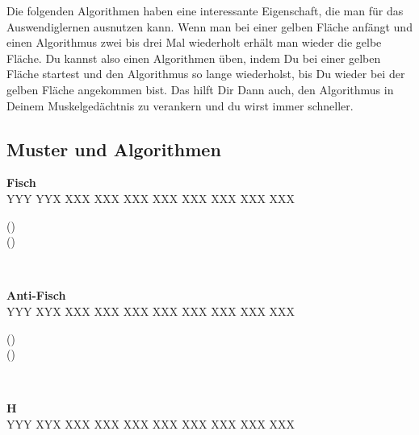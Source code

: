 Die folgenden Algorithmen haben eine interessante Eigenschaft, die man für das Auswendiglernen ausnutzen kann.
Wenn man bei einer gelben Fläche anfängt und einen Algorithmus zwei bis drei Mal wiederholt erhält man wieder die gelbe Fläche.
Du kannst also einen Algorithmen üben, indem Du bei einer gelben Fläche startest und den Algorithmus so lange wiederholst, bis Du wieder bei der gelben Fläche angekommen bist.
Das hilft Dir Dann auch, den Algorithmus in Deinem Muskelgedächtnis zu verankern und du wirst immer schneller.

\subsection{Muster und Algorithmen}
\parbox{0.3\linewidth}{
	\centering
	\textbf{Fisch} \\[1ex]
  \RubikCubeGreyAll%
	      {Y}{Y}{Y}
	      {Y}{Y}{X}%
		 {X}{X}{X}
		 {X}{X}{X}%
		 {X}{X}{X}
		 {X}{X}{X}%
		{X}{X}{X}
		{X}{X}{X}%
		{X}{X}{X}
		{X}{X}{X}%
}%
\parbox{0.7\linewidth}{
	() \\[1em] ()
}\\[1em]
%
%
\parbox{0.3\linewidth}{
\begin{center}
	\textbf{Anti-Fisch} \\[1ex]
  \RubikCubeGreyAll%
	      {Y}{Y}{Y}
	      {X}{Y}{X}%
		 {X}{X}{X}
		 {X}{X}{X}%
		 {X}{X}{X}
		 {X}{X}{X}%
		{X}{X}{X}
		{X}{X}{X}%
		{X}{X}{X}
		{X}{X}{X}%
\end{center}
}%
\parbox{0.7\linewidth}{
	() \\[1em] ()
}\\[1em]
%
%
\parbox{0.3\linewidth}{
\begin{center}
  \textbf{H} \\
  \RubikCubeGreyAll%
	      {Y}{Y}{Y}
	      {X}{Y}{X}%
		 {X}{X}{X}
		 {X}{X}{X}%
		 {X}{X}{X}
		 {X}{X}{X}%
		{X}{X}{X}
		{X}{X}{X}%
		{X}{X}{X}
		{X}{X}{X}%
\end{center}
}%
